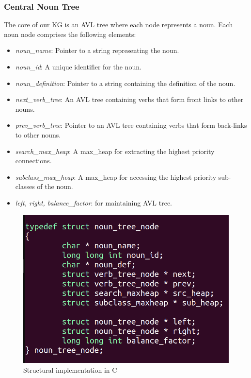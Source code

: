 \documentclass[conference]{IEEEtran}
\begin{document}
\subsubsection{\textbf{Central Noun Tree}}
The core of our KG is an AVL tree where each node represents a noun. Each noun node comprises the following elements:
\begin{itemize}

    \item \textit{noun\_name}: Pointer to a string representing the noun.
    \item \textit{noun\_id}: A unique identifier for the noun.
    \item \textit{noun\_definition}: Pointer to a string containing the definition of the noun.
    \item \textit{next\_verb\_tree}: An AVL tree containing verbs that form front links to other nouns.
    \item \textit{prev\_verb\_tree}: Pointer to an AVL tree containing verbs that form back-links to other nouns.
    \item \textit{search\_max\_heap}: A max\_heap for extracting the highest priority connections.
    \item \textit{subclass\_max\_heap}: A max\_heap for accessing the highest priority sub-classes of the noun.
    \item \textit{left, right, balance\_factor}: for maintaining AVL tree. 
    
\end{itemize}

\begin{figure}[htbp]
\centering
\includegraphics[width=0.8\linewidth]{vi_editor_typedef.png}
\caption{Structural implementation in C}
\label{fig}
\end{figure}
\end{document}
